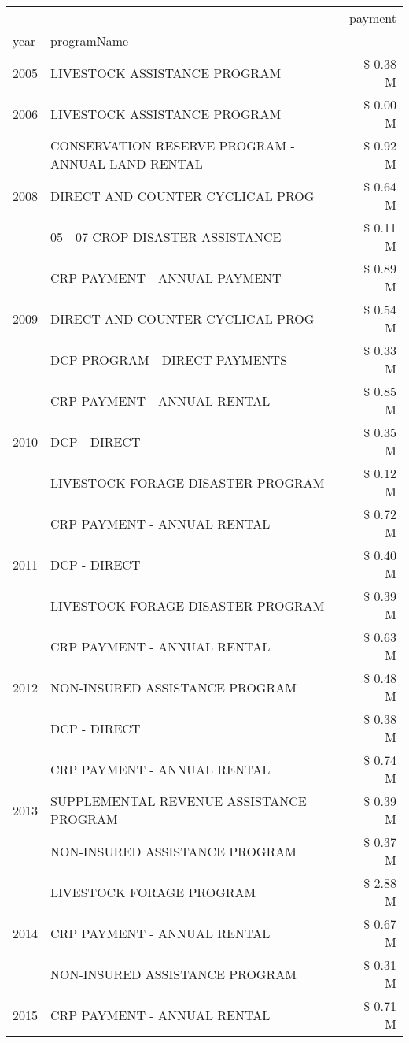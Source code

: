 \begin{tabular}{llr}
\toprule
 &  & payment \\
year & programName &  \\
\midrule
2005 & LIVESTOCK ASSISTANCE PROGRAM & \$ 0.38 M \\
\cline{1-3}
2006 & LIVESTOCK ASSISTANCE PROGRAM & \$ 0.00 M \\
\cline{1-3}
\multirow[t]{3}{*}{2008} & CONSERVATION RESERVE PROGRAM - ANNUAL LAND RENTAL & \$ 0.92 M \\
 & DIRECT AND COUNTER CYCLICAL PROG & \$ 0.64 M \\
 & 05 - 07 CROP DISASTER ASSISTANCE & \$ 0.11 M \\
\cline{1-3}
\multirow[t]{3}{*}{2009} & CRP PAYMENT - ANNUAL PAYMENT & \$ 0.89 M \\
 & DIRECT AND COUNTER CYCLICAL PROG & \$ 0.54 M \\
 & DCP PROGRAM - DIRECT PAYMENTS & \$ 0.33 M \\
\cline{1-3}
\multirow[t]{3}{*}{2010} & CRP PAYMENT - ANNUAL RENTAL & \$ 0.85 M \\
 & DCP - DIRECT & \$ 0.35 M \\
 & LIVESTOCK FORAGE DISASTER PROGRAM & \$ 0.12 M \\
\cline{1-3}
\multirow[t]{3}{*}{2011} & CRP PAYMENT - ANNUAL RENTAL & \$ 0.72 M \\
 & DCP - DIRECT & \$ 0.40 M \\
 & LIVESTOCK FORAGE DISASTER PROGRAM & \$ 0.39 M \\
\cline{1-3}
\multirow[t]{3}{*}{2012} & CRP PAYMENT - ANNUAL RENTAL & \$ 0.63 M \\
 & NON-INSURED ASSISTANCE PROGRAM & \$ 0.48 M \\
 & DCP - DIRECT & \$ 0.38 M \\
\cline{1-3}
\multirow[t]{3}{*}{2013} & CRP PAYMENT - ANNUAL RENTAL & \$ 0.74 M \\
 & SUPPLEMENTAL REVENUE ASSISTANCE PROGRAM & \$ 0.39 M \\
 & NON-INSURED ASSISTANCE PROGRAM & \$ 0.37 M \\
\cline{1-3}
\multirow[t]{3}{*}{2014} & LIVESTOCK FORAGE PROGRAM & \$ 2.88 M \\
 & CRP PAYMENT - ANNUAL RENTAL & \$ 0.67 M \\
 & NON-INSURED ASSISTANCE PROGRAM & \$ 0.31 M \\
\cline{1-3}
\multirow[t]{3}{*}{2015} & CRP PAYMENT - ANNUAL RENTAL & \$ 0.71 M \\

\end{tabular}
